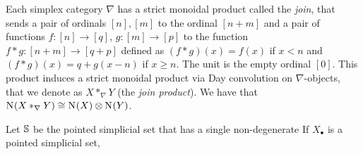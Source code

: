 Each simplex category $\nabla$ has a strict monoidal product called the \emph{join}, that sends a pair of ordinals $[n],[m]$ to the ordinal $[n+m]$ and a pair of functions $f \colon [n] \to [q]$, $g \colon [m] \to [p]$ to the function $f*g \colon [n+m] \to [q+p]$ defined as $(f*g)(x) = f(x)$ if $x< n$ and $(f*g)(x) = q+g(x-n)$ if $x \geq n$. The unit is the empty ordinal $[0]$. This product induces a strict monoidal product via Day convolution on $\nabla$-objects, that we denote as $X*_\nabla Y$ (the \emph{join product}). We have that $\operatorname{N}_{}(X*_\nabla Y)\cong \operatorname{N}_{}(X)\otimes \operatorname{N}_{}(Y)$.

Let $\mathbb{S}$ be the pointed simplicial set that has a single non-degenerate If $X_\bullet$ is a pointed simplicial set,



%
%
%
%
%
%

